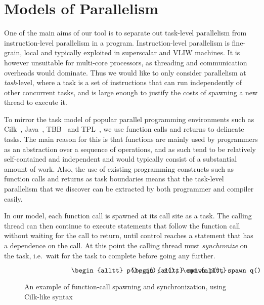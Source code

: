 \section{Models of Parallelism} \label{smethod}

One of the main aims of our tool is to separate out task-level parallelism from instruction-level parallelism in a program.
Instruction-level parallelism is fine-grain, local and typically exploited in superscalar and VLIW machines.
It is however unsuitable for multi-core processors, as threading and communication overheads would dominate.
Thus we would like to only consider parallelism at \emph{task}-level, where a task is a set of instructions that can run independently of other concurrent tasks, and is large enough to justify the costs of spawning a new thread to execute it.

To mirror the task model of popular parallel programming environments such as Cilk~\cite{blumofe96cilk}, Java~\cite{lea00java}, TBB~\cite{reinders07intel} and TPL~\cite{leijen07parallel}, we use function calls and returns to delineate tasks.
The main reason for this is that functions are mainly used by programmers as an abstraction over a sequence of operations, and as such tend to be relatively self-contained and independent and would typically consist of a substantial amount of work.
Also, the use of existing programming constructs such as function calls and returns as task boundaries means that the task-level parallelism that we discover can be extracted by both programmer and compiler easily.

In our model, each function call is spawned at its call site as a task.
The calling thread can then continue to execute statements that follow the function call without waiting for the call to return, until control reaches a statement that has a dependence on the call.
At this point the calling thread must \emph{synchronize} on the task, i.e.\ wait for the task to complete before going any further.

\begin{figure}
\small
\hrulefill
\[
\begin{minipage}[t]{3cm}
\begin{alltt}
   p();
   q();
   r();
\end{alltt}
\end{minipage}
\begin{minipage}[t]{3cm}
\begin{alltt}
   spawn p();
   spawn q();
   sync;
   r();
\end{alltt}
\end{minipage}
\]
\hrulefill
\caption{An example of function-call spawning and synchronization, using Cilk-like syntax}
\label{fforkjoin}
\end{figure}

